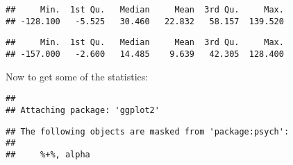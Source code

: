 \documentclass[
]{article}
\newenvironment{Shaded}{\begin{snugshade}}{\end{snugshade}}
\newcommand{\CommentTok}[1]{\textcolor[rgb]{0.56,0.35,0.01}{\textit{#1}}}
\newcommand{\FunctionTok}[1]{\textcolor[rgb]{0.13,0.29,0.53}{\textbf{#1}}}
\newcommand{\NormalTok}[1]{#1}
\newcommand{\OtherTok}[1]{\textcolor[rgb]{0.56,0.35,0.01}{#1}}
\newcommand{\SpecialCharTok}[1]{\textcolor[rgb]{0.81,0.36,0.00}{\textbf{#1}}}
\begin{document}
\begin{verbatim}
##     Min.  1st Qu.   Median     Mean  3rd Qu.     Max. 
## -128.100   -5.525   30.460   22.832   58.157  139.520
\end{verbatim}

\begin{Shaded}
\end{Shaded}

\begin{verbatim}
##     Min.  1st Qu.   Median     Mean  3rd Qu.     Max. 
## -157.000   -2.600   14.485    9.639   42.305  128.400
\end{verbatim}

Now to get some of the statistics:

\begin{Shaded}
\end{Shaded}

\begin{verbatim}
## 
## Attaching package: 'ggplot2'
\end{verbatim}

\begin{verbatim}
## The following objects are masked from 'package:psych':
## 
##     %+%, alpha
\end{verbatim}
\end{document}
